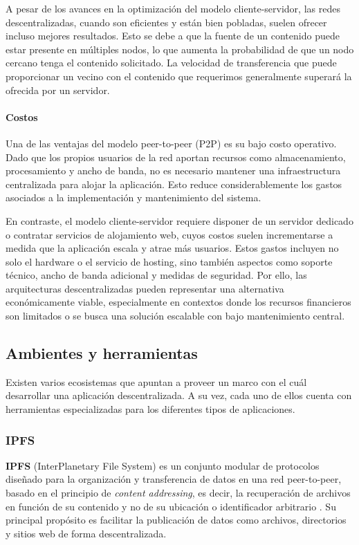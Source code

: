 A pesar de los avances en la optimización del modelo cliente-servidor, las redes descentralizadas, cuando son eficientes y están bien pobladas, suelen ofrecer incluso mejores resultados. Esto se debe a que la fuente de un contenido puede estar presente en múltiples nodos, lo que aumenta la probabilidad de que un nodo cercano tenga el contenido solicitado. La velocidad de transferencia que puede proporcionar un vecino con el contenido que requerimos generalmente superará la ofrecida por un servidor.

\paragraph{Costos}

Una de las ventajas del modelo peer-to-peer (P2P) es su bajo costo operativo. Dado que los propios usuarios de la red aportan recursos como almacenamiento, procesamiento y ancho de banda, no es necesario mantener una infraestructura centralizada para alojar la aplicación. Esto reduce considerablemente los gastos asociados a la implementación y mantenimiento del sistema.

En contraste, el modelo cliente-servidor requiere disponer de un servidor dedicado o contratar servicios de alojamiento web, cuyos costos suelen incrementarse a medida que la aplicación escala y atrae más usuarios. Estos gastos incluyen no solo el hardware o el servicio de hosting, sino también aspectos como soporte técnico, ancho de banda adicional y medidas de seguridad. Por ello, las arquitecturas descentralizadas pueden representar una alternativa económicamente viable, especialmente en contextos donde los recursos financieros son limitados o se busca una solución escalable con bajo mantenimiento central.

\subsection{Ambientes y herramientas}
Existen varios ecosistemas que apuntan a proveer un marco con el cuál desarrollar una aplicación descentralizada. A su vez, cada uno de ellos cuenta con herramientas especializadas para los diferentes tipos de aplicaciones.

\subsubsection{IPFS}

\textbf{IPFS} (InterPlanetary File System) es un conjunto modular de protocolos diseñado para la organización y transferencia de datos en una red peer-to-peer, basado en el principio de \textit{content addressing}, es decir, la recuperación de archivos en función de su contenido y no de su ubicación o identificador arbitrario \cite{ipfs}. Su principal propósito es facilitar la publicación de datos como archivos, directorios y sitios web de forma descentralizada.

